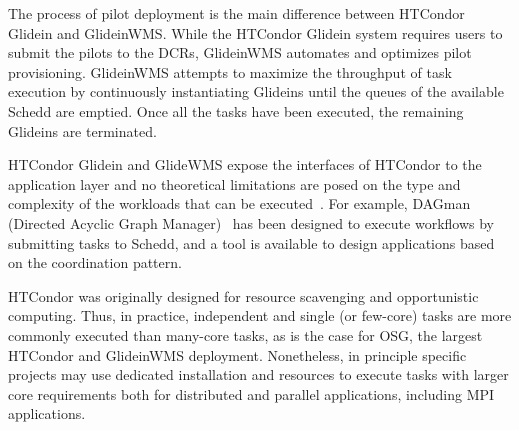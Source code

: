 \documentclass{sig-alternate}
\begin{document}
The process of pilot deployment is the main difference between HTCondor Glidein
and GlideinWMS. While the HTCondor Glidein system requires users to submit the
pilots to the DCRs, GlideinWMS automates and optimizes pilot provisioning.
GlideinWMS attempts to maximize the throughput of task execution by continuously
instantiating Glideins until the queues of the available Schedd are emptied.
Once all the tasks have been executed, the remaining Glideins are terminated.


HTCondor Glidein and GlideWMS expose the interfaces of HTCondor to the
application layer and no theoretical limitations are posed on the type and
complexity of the workloads that can be executed~\cite{couvares2007workflow}.
For example, DAGman (Directed Acyclic Graph Manager)~\cite{frey2002condor} has
been designed to execute workflows by submitting tasks to Schedd, and a tool is
available to design applications based on the \MW coordination pattern.



HTCondor was originally designed for resource scavenging and opportunistic
computing. Thus, in practice, independent and single (or few-core) tasks are
more commonly executed than many-core tasks, as is the case for OSG, the largest
HTCondor and GlideinWMS deployment. Nonetheless, in principle specific projects
may use dedicated installation and resources to execute tasks with larger core
requirements both for distributed and parallel applications, including MPI
applications.

\end{document}

